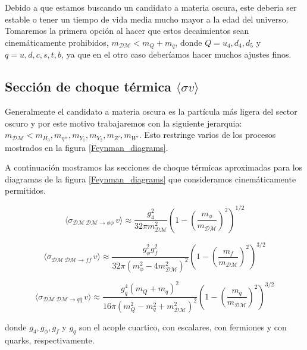 Debido a que estamos buscando un candidato a materia oscura, este deberia ser estable o tener un tiempo de vida media mucho mayor a la edad del universo. Tomaremos la primera opción al hacer que estos decaimientos sean cinemáticamente prohibidos, $m_\mathcal{DM} < m_{Q} + m_q$, donde $Q=u_4,d_4,d_5$ y $q=u,d,c,s,t,b$, ya que en el otro caso deberíamos hacer muchos ajustes finos.

\newpage

\subsection[\hspace{-0.4in}) Sección de choque térmica $\langle \sigma v \rangle$]{Sección de choque térmica $\langle \sigma v \rangle$}

Generalmente el candidato a materia oscura es la partícula más ligera del sector oscuro y por este motivo trabajaremos con la siguiente jerarquia: $m_\mathcal{DM} < m_{H_3},m_{\eta^\pm},m_{Y_1},m_{Y_2},m_{Z'},m_{W'}$. Esto restringe varios de los procesos mostrados en la figura \ref{Feynman_diagrams}.

A continuación mostramos las secciones de choque térmicas aproximadas para los diagramas de la figura \ref{Feynman_diagrams} que consideramos cinemáticamente permitidos.


\begin{equation}
\langle \sigma_{\mathcal{DM} \ \mathcal{DM} \to \phi \phi} \, v \rangle \approx \frac{g_4^2}{32\pi m_\mathcal{DM}^2} \left(1-\left( \frac{m_\phi}{m_\mathcal{DM}}\right)^2 \right)^{1/2}
\end{equation}


\begin{equation}
\langle \sigma_{\mathcal{DM} \ \mathcal{DM} \to f \bar{f}} \, v \rangle \approx \frac{g_\phi^2 g_f^2}{32\pi (m_\phi^2-4m_\mathcal{DM}^2)^2} \left( 1- \left( \frac{m_f}{m_\mathcal{DM}} \right)^2 \right)^{3/2}
\end{equation}


\begin{equation}
\langle \sigma_{\mathcal{DM} \ \mathcal{DM} \to q \bar{q}} \, v \rangle \approx \frac{g_q^4\left(m_Q+m_q\right)^2 }{16\pi (m_Q^2-m_q^2+m_\mathcal{DM}^2)^2 } \left( 1-\left(\frac{m_q}{m_\mathcal{DM}} \right)^2 \right)^{3/2}  
\end{equation}

donde $g_4,g_\phi,g_f$ y $g_q$ son el acople cuartico, con escalares, con fermiones y con quarks, respectivamente.

